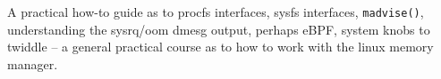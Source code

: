A practical how-to guide as to procfs interfaces, sysfs interfaces,
\texttt{madvise()}, understanding the sysrq/oom dmesg output, perhaps
eBPF, system knobs to twiddle -- a general practical course as to how to work
with the linux memory manager.\\

